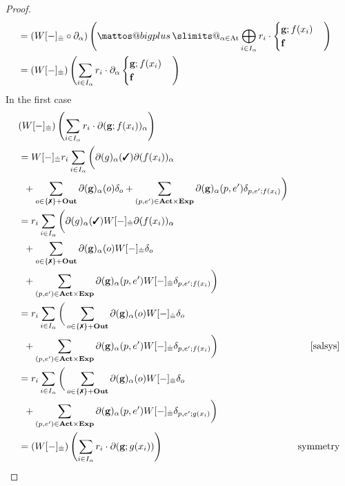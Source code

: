 \documentclass[a4paper,UKenglish,cleveref, autoref, thm-restate]{lipics-v2021}
\makeatletter
\newcommand{\cmark}{\text{\ding{51}}}
\newcommand{\xmark}{\text{\ding{55}}}
\newcommand{\Out}{\textbf{\upshape{Out}}}
\newcommand{\Act}{\textbf{\upshape{Act}}}
\newcommand{\At}{\text{\upshape{At}}}
\newcommand{\Exp}{\textbf{\upshape{Exp}}}
\theoremstyle{plain}\newtheoremrep{thm}{Theorem}[section]
\newcommand{\bigplus}{\DOTSB\mathop{\mathpalette\mattos@bigplus\relax}\slimits@
}
\newcommand\mattos@bigplus[2]{\vcenter{\hbox{\sbox\z@{$#1\sum$}\resizebox{!}{0.9\dimexpr\ht\z@+\dp\z@}{\raisebox{\depth}{$\m@th#1+$}}}}\vphantom{\sum}}
\makeatother
\begin{document}
\begin{toappendix}
\begin{proof}
\begin{align*}
				&=(W[-]_{\dot\equiv} \circ \partial_\alpha)\left(\bigplus_{\alpha \in \At}\bigoplus_{i\in I_\alpha} r_i\cdot \begin{cases}\textbf{g};f(x_i)\\\textbf{f}\end{cases}\right)&\\
				&=(W[-]_{\dot\equiv})\left(\sum_{i \in I_\alpha} r_i\cdot \partial_\alpha\begin{cases}\textbf{g};f(x_i)\\\textbf{f}\end{cases}\right)&
			\end{align*}
			In the first case
			\begin{align*}
				&(W[-]_{\dot\equiv})\left(\sum_{i \in I_\alpha} r_i\cdot \partial(\textbf{g};f(x_i))_\alpha\right)&\\
				&=W[-]_{\dot\equiv}
				r_i\sum_{i \in I_\alpha}\bigg( \partial(g)_\alpha(\cmark)\partial(f(x_i))_\alpha \\&\;\;
				+ \sum_{o \in \{\xmark\} + \Out}\partial(\textbf{g})_\alpha(o)\delta_o 
				 + \sum_{(p, e^\prime) \in \Act\times\Exp} \partial(\textbf{g})_\alpha(p, e^\prime)\delta_{p, e^\prime;f(x_i)}\bigg)&\\
				&=r_i\sum_{i \in I_\alpha}\bigg( \partial(g)_\alpha(\cmark)W[-]_{\dot\equiv}\partial(f(x_i))_\alpha \\&\;\;+ \sum_{o \in \{\xmark\} + \Out}\partial(\textbf{g})_\alpha(o)W[-]_{\dot\equiv}\delta_o \\&\;\;+ \sum_{(p, e^\prime) \in \Act\times\Exp} \partial(\textbf{g})_\alpha(p, e^\prime)W[-]_{\dot\equiv}\delta_{p, e^\prime;f(x_i)}\bigg)&\\
				&=r_i\sum_{i \in I_\alpha} \bigg(\sum_{o \in \{\xmark\} + \Out}\partial(\textbf{g})_\alpha(o)W[-]_{\dot\equiv}\delta_o \\&\;\;+ \sum_{(p, e^\prime) \in \Act\times\Exp} \partial(\textbf{g})_\alpha(p, e^\prime)W[-]_{\dot\equiv}\delta_{p, e^\prime;f(x_i)}\bigg)&\cref{salsys}\\
				&=r_i\sum_{i \in I_\alpha} \bigg(\sum_{o \in \{\xmark\} + \Out}\partial(\textbf{g})_\alpha(o)W[-]_{\dot\equiv}\delta_o \\&\;\;+ \sum_{(p, e^\prime) \in \Act\times\Exp} \partial(\textbf{g})_\alpha(p, e^\prime)W[-]_{\dot\equiv}\delta_{p, e^\prime;g(x_i)}\bigg)&\\
				&=(W[-]_{\dot\equiv})\left(\sum_{i \in I_\alpha} r_i\cdot \partial(\textbf{g};g(x_i))\right)& \text{symmetry}
			\end{align*}

\end{proof}
\end{toappendix}
\end{document}
